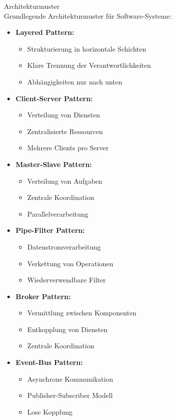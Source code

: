 \begin{concept}{Architekturmuster}\\
Grundlegende Architekturmuster für Software-Systeme:

\begin{itemize}
    \item \textbf{Layered Pattern:} 
    \begin{itemize}
        \item Strukturierung in horizontale Schichten
        \item Klare Trennung der Verantwortlichkeiten
        \item Abhängigkeiten nur nach unten
    \end{itemize}
    
    \item \textbf{Client-Server Pattern:}
    \begin{itemize}
        \item Verteilung von Diensten
        \item Zentralisierte Ressourcen
        \item Mehrere Clients pro Server
    \end{itemize}
    
    \item \textbf{Master-Slave Pattern:}
    \begin{itemize}
        \item Verteilung von Aufgaben
        \item Zentrale Koordination
        \item Parallelverarbeitung
    \end{itemize}
    
    \item \textbf{Pipe-Filter Pattern:}
    \begin{itemize}
        \item Datenstromverarbeitung
        \item Verkettung von Operationen
        \item Wiederverwendbare Filter
    \end{itemize}
    
    \item \textbf{Broker Pattern:}
    \begin{itemize}
        \item Vermittlung zwischen Komponenten
        \item Entkopplung von Diensten
        \item Zentrale Koordination
    \end{itemize}
    
    \item \textbf{Event-Bus Pattern:}
    \begin{itemize}
        \item Asynchrone Kommunikation
        \item Publisher-Subscriber Modell
        \item Lose Kopplung
    \end{itemize}
\end{itemize}
\end{concept}

